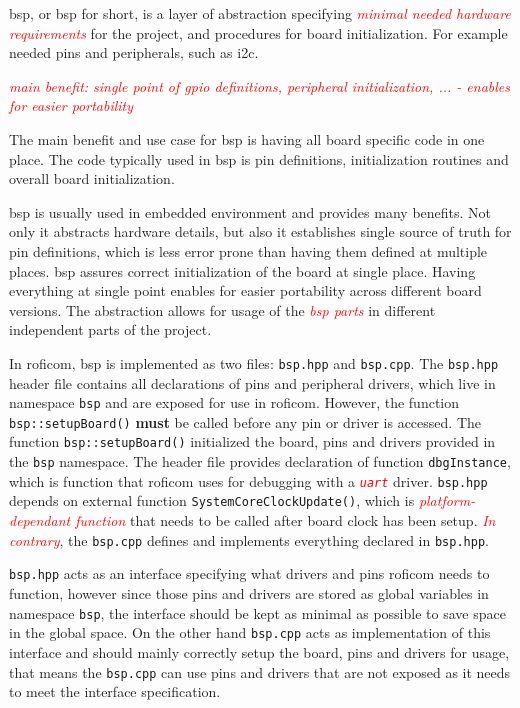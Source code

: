 \documentclass[
  digital,     %
  oneside,     %
  nosansbold,  %
  nocolorbold, %
  lof,         %
  lot,         %
]{fithesis4}
\newcommand{\TODO}[1]{\textcolor{red}{\textit{#1}}}
\begin{document}
{{{\acrlong{bsp}, or \acrshort{bsp} for short, is a layer of abstraction specifying  \TODO{minimal needed hardware requirements} for the project, and procedures for board initialization. For example needed pins and peripherals, such as \acrshort{i2c}. 

\TODO{main benefit: single point of gpio definitions, peripheral initialization, ... - enables for easier portability}

The main benefit and use case for \acrshort{bsp} is having all board specific code in one place. The code typically used in \acrshort{bsp} is pin definitions, initialization routines and overall board initialization.

\acrshort{bsp} is usually used in embedded environment and provides many benefits. Not only it abstracts hardware details, but also it establishes single source of truth for pin definitions, which is less error prone than having them defined at multiple places. \acrshort{bsp} assures correct initialization of the board at single place. Having everything at single point enables for easier portability across different board versions. The abstraction allows for usage of the \TODO{bsp parts} in different independent parts of the project. 

In \acrshort{roficom}, \acrshort{bsp} is implemented as two files: \verb|bsp.hpp| and \verb|bsp.cpp|. The \verb|bsp.hpp| header file contains all declarations of pins and peripheral drivers, which live in namespace \lstinline{bsp} and are exposed for use in \acrshort{roficom}. However, the function \lstinline{bsp::setupBoard()} \textbf{must} be called before any pin or driver is accessed. The function \lstinline{bsp::setupBoard()} initialized the board, pins and drivers provided in the \lstinline{bsp} namespace. The header file provides declaration of function \lstinline{dbgInstance}, which is function that \acrshort{roficom} uses for debugging with a \TODO{ \texttt{uart} } driver. \verb|bsp.hpp| depends on external function \lstinline|SystemCoreClockUpdate()|, which is \TODO{platform-dependant function} that needs to be called after board clock has been setup. \TODO{In contrary}, the \verb|bsp.cpp| defines and implements everything declared in \verb|bsp.hpp|. 

\verb|bsp.hpp| acts as an interface specifying what drivers and pins \acrshort{roficom} needs to function, however since those pins and drivers are stored as global variables in namespace \lstinline{bsp}, the interface should be kept as minimal as possible to save space in the global space. On the other hand \verb|bsp.cpp| acts as implementation of this interface and should mainly correctly setup the board, pins and drivers for usage, that means the \verb|bsp.cpp| can use pins and drivers that are not exposed as it needs to meet the interface specification.

}}}
\end{document}

